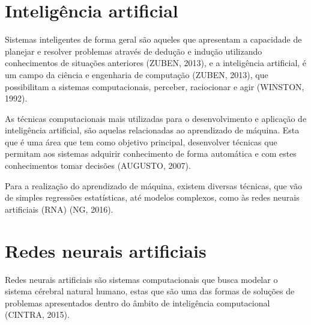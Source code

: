 \section{Inteligência artificial}



Sistemas inteligentes de forma geral são aqueles que apresentam a capacidade de planejar e resolver problemas através de dedução e indução utilizando conhecimentos de situações anteriores (ZUBEN, 2013), e a inteligência artificial, é um campo da ciência e engenharia de computação (ZUBEN, 2013), que possibilitam a sistemas computacionais, perceber, raciocionar e agir (WINSTON, 1992).

As técnicas computacionais mais utilizadas para o desenvolvimento e aplicação de inteligência artificial, são aquelas relacionadas ao aprendizado de máquina. Esta que é uma área que tem como objetivo principal, desenvolver técnicas que permitam aos sistemas adquirir conhecimento de forma automática e com estes conhecimentos tomar decisões (AUGUSTO, 2007).

Para a realização do aprendizado de máquina, existem diversas técnicas, que vão de simples regressões estatísticas, até modelos complexos, como às redes neurais artificiais (RNA) (NG, 2016).

\section{Redes neurais artificiais}


Redes neurais artificiais são sistemas computacionais que busca modelar o sistema cérebral natural humano, estas que são uma das formas de soluções de problemas apresentados dentro do âmbito de inteligência computacional (CINTRA, 2015).

